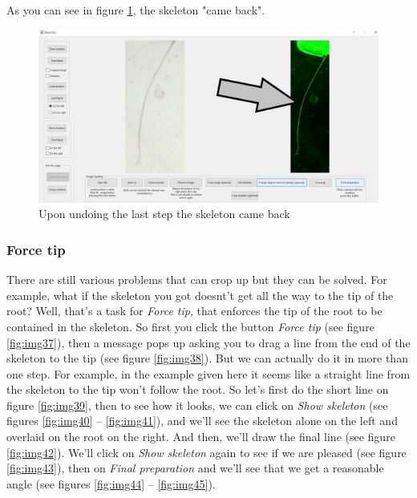 As you can see in figure \ref{fig:img36}, the skeleton "came back".

\begin{figure}[H]
	\centering
	\includegraphics[width=\textwidth]{../Figures/manual/optionalA7.jpg}
	\caption{Upon undoing the last step the skeleton came back}
	\label{fig:img36}
\end{figure}


\subsubsection{Force tip}

There are still various problems that can crop up but they can be solved.
For example, what if the skeleton you got doesnt't get all the way to the tip of the root? 
Well, that's a task for \textit{Force tip}, that enforces the tip of the root to be contained in the skeleton. 
So first you click the button \textit{Force tip} (see figure \ref{fig:img37}), then a message pops up asking you to drag a line from the end of the skeleton to the tip (see figure \ref{fig:img38}).
But we can actually do it in more than one step. For example, in the example given here it seems like a straight line from the skeleton to the tip won't follow the root. 
So let's first do the short line on figure \ref{fig:img39}, then to see how it looks, we can click on \textit{Show skeleton} (see figures \ref{fig:img40} -- \ref{fig:img41}),
and we'll see the skeleton alone on the left and overlaid on the root on the right. 
And then, we'll draw the final line (see figure \ref{fig:img42}).
We'll click on \textit{Show skeleton} again to see if we are pleased (see figure \ref{fig:img43}), then on \textit{Final preparation} and we'll see that we get a reasonable angle (see figures \ref{fig:img44} -- \ref{fig:img45}).


